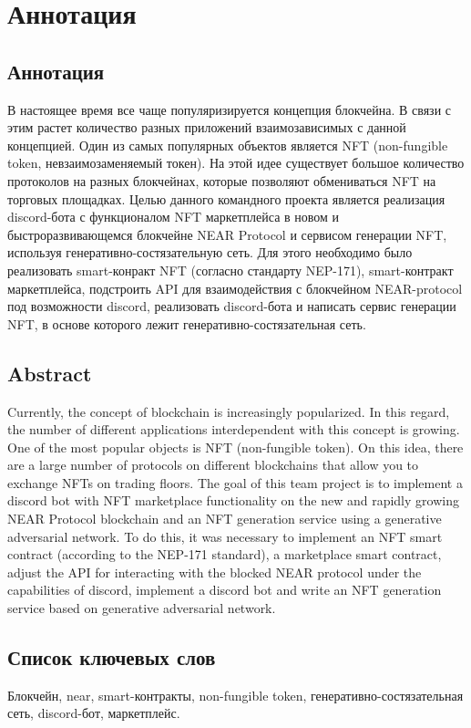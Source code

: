 \section{Аннотация}

\subsection{Аннотация}

В настоящее время все чаще популяризируется концепция блокчейна. В связи с этим растет количество разных приложений взаимозависимых с данной концепцией. Один из самых популярных объектов является NFT (non-fungible token, невзаимозаменяемый токен). На этой идее существует большое количество протоколов на разных блокчейнах, которые позволяют обмениваться NFT на торговых площадках. Целью данного командного проекта является реализация discord-бота с функционалом NFT маркетплейса в новом и быстроразвивающемся блокчейне NEAR Protocol и сервисом генерации NFT, используя генеративно-состязательную сеть. Для этого необходимо было реализовать smart-конракт NFT (согласно стандарту NEP-171), smart-контракт маркетплейса, подстроить API для взаимодействия с блокчейном NEAR-protocol под возможности discord, реализовать discord-бота и написать сервис генерации NFT, в основе которого лежит генеративно-состязательная сеть.

\subsection{Abstract}
Currently, the concept of blockchain is increasingly popularized. In this regard, the number of different applications interdependent with this concept is growing. One of the most popular objects is NFT (non-fungible token). On this idea, there are a large number of protocols on different blockchains that allow you to exchange NFTs on trading floors. The goal of this team project is to implement a discord bot with NFT marketplace functionality on the new and rapidly growing NEAR Protocol blockchain and an NFT generation service using a generative adversarial network. To do this, it was necessary to implement an NFT smart contract (according to the NEP-171 standard), a marketplace smart contract, adjust the API for interacting with the blocked NEAR protocol under the capabilities of discord, implement a discord bot and write an NFT generation service based on generative adversarial network.

\subsection{Список ключевых слов}
Блокчейн, near, smart-контракты, non-fungible token, генеративно-состязательная сеть, discord-бот, маркетплейс.

\newpage
